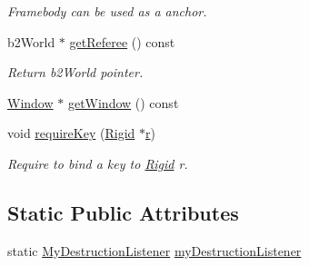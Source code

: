 \begin{DoxyCompactItemize}
\begin{DoxyCompactList}\small\item\em Framebody can be used as a anchor. \end{DoxyCompactList}\item 
b2\+World $\ast$ \hyperlink{classWorld_a168a98614eb17737e8f74b2e6417f457}{get\+Referee} () const 
\begin{DoxyCompactList}\small\item\em Return b2\+World pointer. \end{DoxyCompactList}\item 
\hyperlink{classWindow}{Window} $\ast$ \hyperlink{classWorld_a79ac276692fe3e6cddc8401528ed39b8}{get\+Window} () const 
\item 
void \hyperlink{classWorld_a1da0d80d5a3fcf7858efefeaa9054569}{require\+Key} (\hyperlink{classRigid}{Rigid} $\ast$\hyperlink{image_8h_a62969232668331297e2dca1ae2ddd10d}{r})
\begin{DoxyCompactList}\small\item\em Require to bind a key to \hyperlink{classRigid}{Rigid} r. \end{DoxyCompactList}\end{DoxyCompactItemize}
\subsection*{Static Public Attributes}
\begin{DoxyCompactItemize}
\item 
static \hyperlink{classWorld_1_1MyDestructionListener}{My\+Destruction\+Listener} \hyperlink{classWorld_a9fe52553a01225766d31480cc99b79ef}{my\+Destruction\+Listener}
\end{DoxyCompactItemize}
